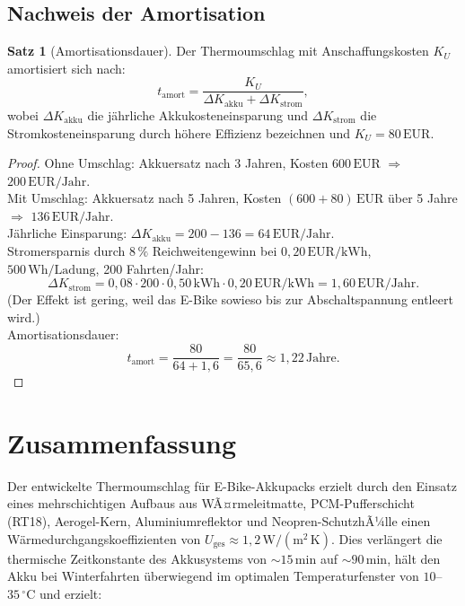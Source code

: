 ﻿\documentclass[a4paper,12pt]{article}
\theoremstyle{definition}
\newtheorem{satz}{Satz}
\begin{document}
\subsection{Nachweis der Amortisation}

\begin{satz}[Amortisationsdauer]
\label{satz:amortisation}
Der Thermoumschlag mit Anschaffungskosten $K_U$ amortisiert sich nach:
\[
  t_\mathrm{amort} = \frac{K_U}{\Delta K_\mathrm{akku} + \Delta K_\mathrm{strom}},
\]
wobei $\Delta K_\mathrm{akku}$ die j\"ahrliche Akkukosteneinsparung und $\Delta K_\mathrm{strom}$ die Stromkosteneinsparung durch h\"ohere Effizienz bezeichnen und $K_U = 80\,\text{EUR}$.
\end{satz}

\begin{proof}
Ohne Umschlag: Akkuersatz nach 3 Jahren, Kosten $600\,\text{EUR}$ $\Rightarrow$ $200\,\text{EUR}/\text{Jahr}$.\\
Mit Umschlag: Akkuersatz nach 5 Jahren, Kosten $(600 + 80)\,\text{EUR}$ \"uber 5 Jahre $\Rightarrow$ $136\,\text{EUR}/\text{Jahr}$.\\
J\"ahrliche Einsparung: $\Delta K_\mathrm{akku} = 200 - 136 = 64\,\text{EUR}/\text{Jahr}$.\\
Stromersparnis durch $8\,\%$ Reichweitengewinn bei $0{,}20\,\text{EUR}/\mathrm{kWh}$, $500\,\text{Wh/Ladung}$, 200 Fahrten/Jahr:
\[
  \Delta K_\mathrm{strom} = 0{,}08 \cdot 200 \cdot 0{,}50\,\text{kWh} \cdot 0{,}20\,\text{EUR}/\text{kWh} = 1{,}60\,\text{EUR}/\text{Jahr}.
\]
(Der Effekt ist gering, weil das E-Bike sowieso bis zur Abschaltspannung entleert wird.)\\
Amortisationsdauer:
\[
  t_\mathrm{amort} = \frac{80}{64 + 1{,}6} = \frac{80}{65{,}6} \approx 1{,}22\,\text{Jahre}.
\]
\end{proof}

\section{Zusammenfassung}

Der entwickelte Thermoumschlag f\"ur E-Bike-Akkupacks erzielt durch den Einsatz eines mehrschichtigen Aufbaus aus WÃ¤rmeleitmatte, PCM-Pufferschicht (RT18), Aerogel-Kern, Aluminiumreflektor und Neopren-SchutzhÃ¼lle einen W\"armedurchgangskoeffizienten von $U_\mathrm{ges} \approx 1{,}2\,\mathrm{W/(m^2\,K)}$. Dies verl\"angert die thermische Zeitkonstante des Akkusystems von $\sim 15\,\mathrm{min}$ auf $\sim 90\,\mathrm{min}$, h\"alt den Akku bei Winterfahrten \"uberwiegend im optimalen Temperaturfenster von $10$--$35\,{}^\circ\mathrm{C}$ und erzielt:
\end{document}
